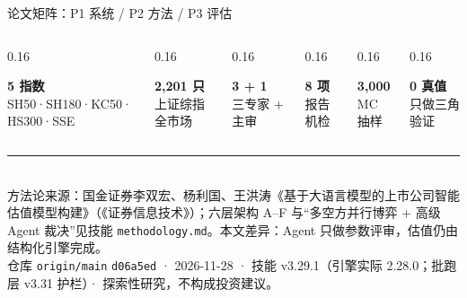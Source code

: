 \documentclass[final]{beamer}
\newcommand{\kw}[1]{\textcolor{csred}{\textbf{#1}}}
\begin{document}
\begin{frame}[t]
\begin{block}{论文矩阵：P1 系统 / P2 方法 / P3 评估}
{\fontsize{20}{24}\selectfont
\begin{columns}[t,onlytextwidth]
\begin{column}{0.16\textwidth}\colorbox{softamber}{\parbox{\dimexpr\linewidth-2\fboxsep}{\centering\kw{5 指数}\\SH50·SH180·KC50·HS300·SSE}}\end{column}
\begin{column}{0.16\textwidth}\colorbox{softamber}{\parbox{\dimexpr\linewidth-2\fboxsep}{\centering\kw{2,201 只}\\上证综指全市场}}\end{column}
\begin{column}{0.16\textwidth}\colorbox{softamber}{\parbox{\dimexpr\linewidth-2\fboxsep}{\centering\kw{3 + 1}\\三专家 + 主审}}\end{column}
\begin{column}{0.16\textwidth}\colorbox{softamber}{\parbox{\dimexpr\linewidth-2\fboxsep}{\centering\kw{8 项}\\报告机检}}\end{column}
\begin{column}{0.16\textwidth}\colorbox{softamber}{\parbox{\dimexpr\linewidth-2\fboxsep}{\centering\kw{3,000}\\MC 抽样}}\end{column}
\begin{column}{0.16\textwidth}\colorbox{softred}{\parbox{\dimexpr\linewidth-2\fboxsep}{\centering\kw{0 真值}\\只做三角验证}}\end{column}
\end{columns}}
\end{block}

\vfill
{\color{line}\rule{\linewidth}{0.4mm}}\\[2mm]
{\fontsize{14}{18}\selectfont\color{dim}
方法论来源：国金证券李双宏、杨利国、王洪涛《基于大语言模型的上市公司智能估值模型构建》（《证券信息技术》）；六层架构 A–F 与“多空方并行博弈 + 高级 Agent 裁决”见技能 \texttt{methodology.md}。本文差异：Agent 只做参数评审，估值仍由结构化引擎完成。\\
仓库 \texttt{origin/main} \texttt{d06a5ed} · 2026-11-28 · 技能 v3.29.1（引擎实际 2.28.0；批跑层 v3.31 护栏）· 探索性研究，不构成投资建议。}

\end{frame}
\end{document}
